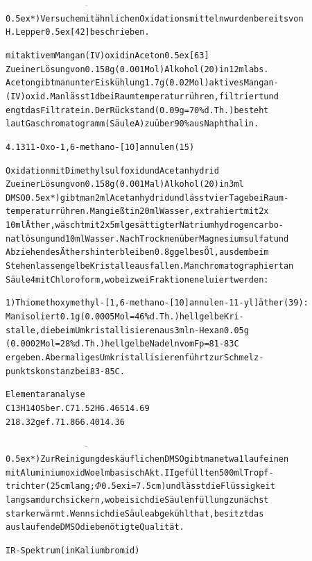 \documentclass[a4paper,11pt]{article}
\begin{document}
\begin{alltt}
 
\(\overline{\hspace{7cm}}\)
\leavevmode\raise0.5ex\hbox{*}) Versuche mit ähnlichen Oxidationsmitteln wurden bereits von
   H. Lepper \raise0.5ex\hbox{[42]} beschrieben.

\newpage
{}


mit aktivem Mangan(IV)oxid in Aceton \raise0.5ex\hbox{[63]}
Zu einer Lösung von 0.158 g (0.001 Mol) Alkohol (20) in 12 ml abs.
Aceton gibt man unter Eiskühlung 1.7 g (0.02 Mol) aktives Mangan-
(IV)oxid. Man lässt 1 d bei Raumtemperatur rühren, filtriert und
engt das Filtrat ein. Der Rückstand (0.09 g = 70 \% d.Th.) besteht
laut Gaschromatogramm (Säule A) zu über 90 \% aus Naphthalin.

 

4.13 11-Oxo-1,6-methano-[10]annulen (15)

Oxidation mit Dimethylsulfoxid und Acetanhydrid
Zu einer Lösung von 0.158 g (0.001 Mal) Alkohol (20) in 3 ml
DMSO \leavevmode\raise0.5ex\hbox{*}) gibt man 2 ml Acetanhydrid und lässt vier Tage bei Raum-
temperatur rühren. Man gießt in 20 ml Wasser, extrahiert mit 2 x
10 ml Äther, wäscht mit 2 x 5 ml gesättigter Natriumhydrogencarbo-
natlösung und 10 ml Wasser. Nach Trocknen über Magnesiumsulfat und
Abziehen des Äthers hinterbleiben 0.8 g gelbes Öl, aus dem beim
Stehenlassen gelbe Kristalle ausfallen. Man chromatographiert an
Säule 4 mit Chloroform, wobei zwei Fraktionen eluiert werden:

1) Thiomethoxymethyl-[1,6-methano-[10]annulen-11-yl]äther (39):
Man isoliert 0.1 g (0.0005 Mol = 46 \% d.Th.) hellgelbe Kri-
stalle, die beim Umkristallisieren aus 3 ml n-Hexan 0.05 g
(0.0002 Mol = 28 \% d.Th.) hellgelbe Nadeln vom Fp = 81 - 83\degree{}C
ergeben. Abermaliges Umkristallisieren führt zur Schmelz-
punktskonstanz bei 83 - 85\degree{}C.

Elementaranalyse
C13H14OS    ber.   C   71.52   H    6.46    S 14.69
218.32      gef.       71.86        6.40      14.36

 
\(\overline{\hspace{7cm}}\)
\leavevmode\raise0.5ex\hbox{*}) Zur Reinigung des käuflichen DMSO gibt man etwa 1 l auf einen
   mit Aluminiumoxid Woelm basisch Akt. II gefüllten 500 ml Tropf-
   trichter (25 cm lang; \(\Phi\)\lower0.5ex\hbox{i} = 7.5 cm) und lässt die Flüssigkeit
   langsam durchsickern, wobei sich die Säulenfüllung zunächst
   stark erwärmt. Wenn sich die Säule abgekühlt hat, besitzt das
   auslaufende DMSO die benötigte Qualität.

\newpage
{}


IR-Spektrum (in Kaliumbromid)
\end{alltt}
\end{document}
